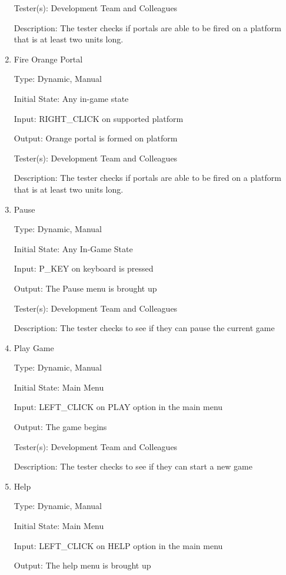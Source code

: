 \documentclass[12pt, titlepage]{article}
\begin{document}
\begin{enumerate}
Tester(s): Development Team and Colleagues

Description: The tester checks if portals are able to be fired on a platform that is at least two units long.

\item{Fire Orange Portal\\}

Type: Dynamic, Manual

Initial State: Any in-game state

Input: RIGHT\_CLICK on supported platform

Output: Orange portal is formed on platform

Tester(s): Development Team and Colleagues

Description: The tester checks if portals are able to be fired on a platform that is at least two units long.

\item{Pause\\}

Type: Dynamic, Manual

Initial State: Any In-Game State

Input: P\_KEY on keyboard is pressed

Output: The Pause menu is brought up

Tester(s): Development Team and Colleagues

Description: The tester checks to see if they can pause the current game

\item{Play Game\\}

Type: Dynamic, Manual

Initial State: Main Menu

Input: LEFT\_CLICK on PLAY option in the main menu

Output: The game begins

Tester(s): Development Team and Colleagues

Description: The tester checks to see if they can start a new game

\item{Help\\}

Type: Dynamic, Manual

Initial State: Main Menu

Input: LEFT\_CLICK on HELP option in the main menu

Output: The help menu is brought up


\end{enumerate}
\end{document}
